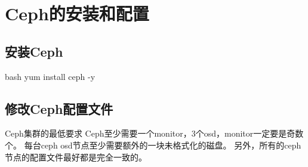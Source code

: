 \section{Ceph的安装和配置}

\subsection{安装Ceph}

\begin{code-block}{bash}
yum install ceph -y
\end{code-block}

\subsection{修改Ceph配置文件}
Ceph集群的最低要求
    Ceph至少需要一个monitor，3个osd，monitor一定要是奇数个。
    每台ceph osd节点至少需要额外的一块未格式化的磁盘。
    另外，所有的ceph节点的配置文件最好都是完全一致的。

